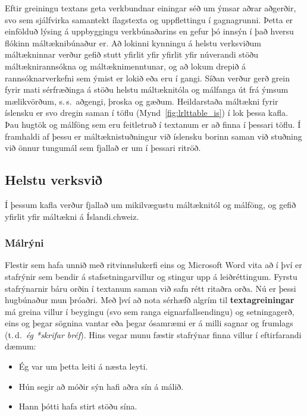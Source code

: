 \documentclass{../../metanetpaper}
\begin{document}
\begin{multicols}{2}
Eftir greiningu textans geta verkbundnar einingar séð um ýmsar aðrar aðgerðir, svo sem sjálfvirka samantekt ílagstexta og uppflettingu í gagnagrunni. Þetta er einfölduð lýsing á uppbyggingu verkbúnaðarins en gefur þó innsýn í það hversu flókinn máltæknibúnaður er. 
Að lokinni kynningu á helstu verksviðum máltækninnar verður gefið stutt yfirlit yfir yfirlit yfir núverandi stöðu máltæknirannsókna og máltæknimenntunar, og að lokum drepið á rannsóknarverkefni sem ýmist er lokið eða eru í gangi. Síðan verður gerð grein fyrir mati sérfræðinga á stöðu helstu máltæknitóla og málfanga út frá ýmsum mælikvörðum, s.\,s.~aðgengi, þroska og gæðum. Heildarstaða máltækni fyrir íslensku er svo dregin saman í töflu (Mynd~\ref{fig:lrlttable_is}) í lok þessa kafla. Þau hugtök og málföng sem eru feitletruð í textanum er að finna í þessari töflu. Í framhaldi af þessu er máltæknistuðningur við íslensku borinn saman við stuðning við önnur tungumál sem fjallað er um í þessari ritröð.

\subsection{Helstu verksvið} 

Í þessum kafla verður fjallað um mikilvægustu máltæknitól og málföng, og gefið yfirlit yfir máltækni á Íslandi.chweiz. 

\subsubsection{Málrýni}

Flestir sem hafa unnið með ritvinnslukerfi eins og Microsoft Word vita að í því er stafrýnir sem bendir á stafsetningarvillur og stingur upp á leiðréttingum. Fyrstu stafrýnarnir báru orðin í textanum saman við safn rétt ritaðra orða. Nú er þessi hugbúnaður mun þróaðri. Með því að nota sérhæfð algrím til \textbf{textagreiningar} má greina villur í beygingu (svo sem ranga eignarfallsendingu) og setningagerð, eins og þegar sögnina vantar eða þegar ósamræmi er á milli sagnar og frumlags (t.\,d.~\textit{ég *skrifar bréf}). Hins vegar munu fæstir stafrýnar finna villur í eftirfarandi dæmum:

\begin{itemize}
\item Ég var um þetta leiti á næsta leyti.
\item Hún segir að móðir sýn hafi aðra sín á málið.
\item Hann þótti hafa stirt stöðu sína.
\end{itemize}


\end{multicols}
\end{document}
